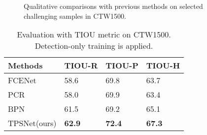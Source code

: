 \documentclass[sigconf]{acmart}
\begin{document}
	\begin{figure}[t]
		\vspace{-0.15cm} 
		\centering
		\setlength{\abovecaptionskip}{5px}
		\subfigbottomskip=-3pt
		\subfigcapskip=-5pt
		\hspace{1.5pt}
		\vspace{-2pt}\\
		\hspace{1.5pt}
		\vspace{-2pt}\\
		\hspace{1.5pt}
		\caption{Qualitative comparisons with previous methods on selected challenging samples in CTW1500.}
		\label{fig:quali}
		\vspace{-13px}
	\end{figure}
	
	\begin{table}[t]
		\setlength{\abovecaptionskip}{0cm}  \small
		\caption{Evaluation with TIOU \cite{liu2019tightness} metric on CTW1500. Detection-only training is applied.}
		\centering
\begin{tabularx}{\linewidth}{@{}lYYY@{}}
			\toprule
			Methods & TIOU-R & TIOU-P & TIOU-H \\ \midrule
			FCENet \cite{zhu2021fourier}  & 58.6   & 69.8   & 63.7   \\
			PCR \cite{dai2021progressive}     & 58.0     & 69.9   & 63.4   \\
			BPN \cite{zhang2021adaptive} & 61.5   & 69.2   & 65.1   \\ \midrule
			TPSNet(ours)  & \textbf{62.9}   & \textbf{72.4}   & \textbf{67.3}   \\ \bottomrule
		\end{tabularx}
		\label{tab:tiou}
		\vspace{-15px}
	\end{table}
	
\end{document}
